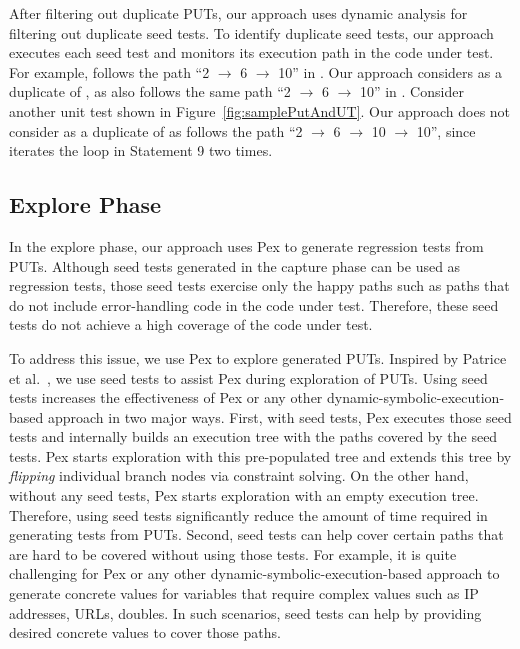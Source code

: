 After filtering out duplicate PUTs, our approach uses dynamic analysis for filtering 
out duplicate seed tests. To identify duplicate seed tests,
our approach executes each seed test and monitors its execution path 
in the code under test. For example,  follows the 
path ``2 $\rightarrow$ 6 $\rightarrow$ 10'' in . Our approach considers 
 as a duplicate of , as 
also follows the same path ``2 $\rightarrow$ 6 $\rightarrow$ 10'' in . 
Consider another unit test  shown in Figure~\ref{fig:samplePutAndUT}.
Our approach does not consider  as a duplicate of 
as  follows the path ``2 $\rightarrow$ 6 $\rightarrow$ 10 $\rightarrow$ 10'',
since  iterates the loop in Statement 9 two times.

\subsection{Explore Phase}
\label{sec:explore}

In the explore phase, our approach uses Pex to generate regression tests from PUTs. Although
seed tests generated in the capture phase can be used as regression tests, those
seed tests exercise only the happy paths such as paths that do not include 
error-handling code in the code under test. Therefore, these seed tests do not
achieve a high coverage of the code under test.

To address this issue, we use Pex to explore generated PUTs. Inspired by Patrice et al.~\cite{patrice08:whitebox},
we use seed tests to assist Pex during exploration of PUTs. Using seed tests increases
the effectiveness of Pex or any other dynamic-symbolic-execution-based approach in two major ways. First,
with seed tests, Pex executes those seed tests and internally builds an execution
tree with the paths covered by the seed tests. Pex starts exploration with this pre-populated tree
and extends this tree by \emph{flipping} individual branch nodes via constraint solving.
On the other hand, without any seed tests, Pex starts exploration with an empty
execution tree. Therefore, using seed tests significantly reduce the 
amount of time required in generating tests from PUTs. Second, seed tests can 
help cover certain paths that are hard to be covered without using
those tests. For example, it is quite challenging for Pex or any other 
dynamic-symbolic-execution-based approach to generate concrete values for variables
that require complex values such as IP addresses, URLs, doubles. In such scenarios,
seed tests can help by providing desired concrete values to cover those paths.

